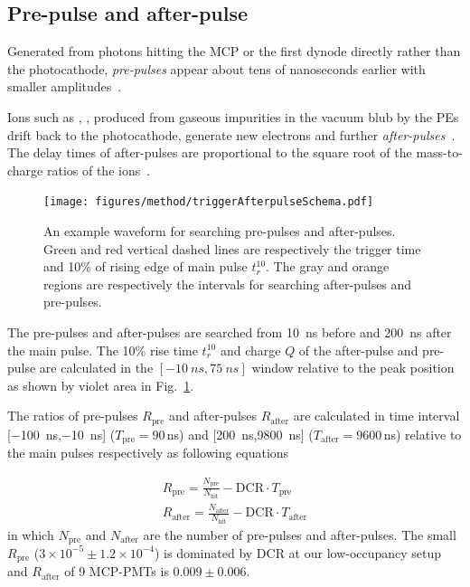 \subsection{Pre-pulse and after-pulse}
\label{sec:afterpulse}
Generated from photons hitting the MCP or the first dynode directly rather than the photocathode, \emph{pre-pulses} appear about tens of nanoseconds earlier with smaller amplitudes~\cite{JUNOMassTesting}.

Ions such as , ,  produced from gaseous impurities in the vacuum blub by the PEs drift back to the photocathode, generate new electrons and further \emph{after-pulses}~\cite{JUNOMassTesting,Coates_1973}. The delay times of after-pulses are proportional to the square root of the mass-to-charge ratios of the ions~\cite{XENON1TTesting,Coates_1973,afterpulseTime}. %
\begin{figure}
    \centering
    \texttt{[image: figures/method/triggerAfterpulseSchema.pdf]}
    \caption{An example waveform for searching pre-pulses and after-pulses. Green and red vertical dashed lines are respectively the trigger time and 10\% of rising edge of main pulse $t_r^{10}$. The gray and orange regions are respectively the intervals for searching after-pulses and pre-pulses.}
    \label{fig:afterpulseSchema}
\end{figure}

The pre-pulses and after-pulses are searched from \SI{10}{ns} before and \SI{200}{ns} after the main pulse. The 10\% rise time $t_r^{10}$ and charge $Q$ of the after-pulse and pre-pulse are calculated in the $[-\SI{10}{ns},\SI{75}{ns}]$ window relative to the peak position as shown by violet area in Fig.~\ref{fig:afterpulseSchema}.

The ratios of pre-pulses $R_{\mathrm{pre}}$ and after-pulses $R_{\mathrm{after}}$ are calculated in time interval [\SI{-100}{ns},\SI{-10}{ns}] ($T_{\mathrm{pre}}=90$\,ns) and [\SI{200}{ns},\SI{9800}{ns}] ($T_{\mathrm{after}}=9600$\,ns) relative to the main pulses respectively as following equations

\begin{align}
    R_{\mathrm{pre}} = \frac{N_{\mathrm{pre}}}{N_\mathrm{hit}} - \mathrm{DCR}\cdot T_{\mathrm{pre}}\\
    R_{\mathrm{after}} = \frac{N_{\mathrm{after}}}{N_\mathrm{hit}} - \mathrm{DCR}\cdot T_{\mathrm{after}}
\end{align}
in which $N_{\mathrm{pre}}$ and $N_{\mathrm{after}}$ are the number of pre-pulses and after-pulses.  The small $R_{\mathrm{pre}}$ ($3\times10^{-5}\pm1.2\times10^{-4}$) is dominated by DCR at our low-occupancy setup and $R_{\mathrm{after}}$ of 9 MCP-PMTs is $0.009\pm0.006$.

